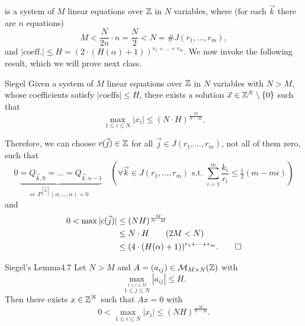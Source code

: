 \documentclass{Vorlesungstemplate_English} %
\begin{document}
\begin{pf}
  is a system of $M$ linear equations over $\mathbb{Z}$ in $N$ variables, where (for each $\vec k$ there are $n$ equations)
  \[ M < \frac{N}{2n}\cdot n = \frac{N}{2} < N = \#J(r_1, \dots, r_m),\]
  and $|\text{coeff.}| \leq H = (2\cdot(H(\alpha)+1))^{r_1 + \dots + r_m}$. We now invoke the following result, which we will prove next class.
  \begin{lemma*}{Siegel}
   Given a system of $M$ linear equations over $\mathbb{Z}$ in $N$ variables with $N > M$, whose coefficients satisfy $|\text{coeffs}| \leq H$, there exists a solution $\vec x \in \mathbb{Z}^N \setminus \{ 0\}$ such that
    \[ \max_{1 \leq i \leq N}|x_i| \leq (N\cdot H)^{\frac{M}{N-M}}.\]
    \end{lemma*}
  Therefore, we can choose $c(\vec j) \in \mathbb{Z}$ for all $\vec j \in J(r_1, \dots, r_m)$, not all of them zero, such that
  \[ \underbrace{0 = Q_{\vec k, 0} = \dots = Q_{\vec k, n-1}}_{\iff\, P^{[\vec k]}(\alpha, \dots, \alpha) = 0} \quad \left(\forall \vec k \in J(r_1, \dots, r_m) \text{ s.t. } \sum_{i=1}^m\frac{k_i}{r_i} \leq \tfrac{1}{2}(m-m\epsilon)\right)\]
  and
  \begin{align*}
    0 < \max|c(\vec j)| &\leq (NH)^{\frac{M}{N-M}} \\
    &\leq N\cdot H \tag{$2M < N$} \\
    &\leq (4\cdot(H(\alpha)+1))^{r_1 + \dots + r_m}. \qedhere
  \end{align*}
\end{pf}
\begin{theorem}{Siegel's Lemma}{4.7}
  Let $N>M$ and $A = (a_{ij}) \in \mathcal{M}_{M \times N}(\mathbb{Z})$ with \[\max_{\stackrel{1 \leq i \leq M}{1 \leq j\leq N}}|a_{ij}| \leq H.\] Then there exists $x \in \mathbb{Z}^N$ such that $Ax = 0$ with \[ 0 < \max_{1 \leq i \leq N}|x_i| \leq (NH)^{\frac{M}{N-M}}.\]
\end{theorem}
\end{document}
